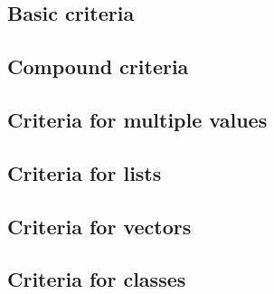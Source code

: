 \documentclass{article}
\begin{document}
\subsection{Basic criteria}












\subsection{Compound criteria}







\subsection{Criteria for multiple values}



\subsection{Criteria for lists}



\subsection{Criteria for vectors}

\subsection{Criteria for classes}

%
\end{document}
